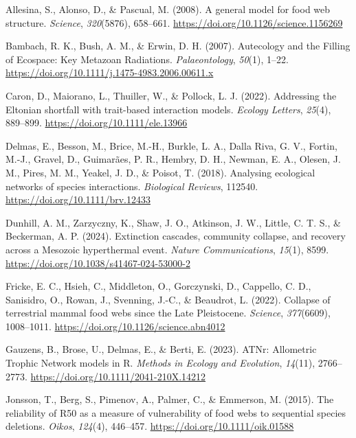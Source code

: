 \documentclass[
]{article}
\newlength{\cslhangindent}
\newenvironment{CSLReferences}[2] %
 {\begin{list}{}{%
  \setlength{\itemindent}{0pt}
  \setlength{\leftmargin}{0pt}
  \setlength{\parsep}{0pt}
  \ifodd #1
   \setlength{\leftmargin}{\cslhangindent}
   \setlength{\itemindent}{-1\cslhangindent}
  \fi
  \setlength{\itemsep}{#2\baselineskip}}}
 {\end{list}}
\begin{document}
\label{refs}
\begin{CSLReferences}{1}{0}
Allesina, S., Alonso, D., \& Pascual, M. (2008). A general model for
food web structure. \emph{Science}, \emph{320}(5876), 658--661.
\url{https://doi.org/10.1126/science.1156269}

Bambach, R. K., Bush, A. M., \& Erwin, D. H. (2007). Autecology and the
Filling of Ecospace: Key Metazoan Radiations. \emph{Palaeontology},
\emph{50}(1), 1--22.
\url{https://doi.org/10.1111/j.1475-4983.2006.00611.x}

Caron, D., Maiorano, L., Thuiller, W., \& Pollock, L. J. (2022).
Addressing the Eltonian shortfall with trait-based interaction models.
\emph{Ecology Letters}, \emph{25}(4), 889--899.
\url{https://doi.org/10.1111/ele.13966}

Delmas, E., Besson, M., Brice, M.-H., Burkle, L. A., Dalla Riva, G. V.,
Fortin, M.-J., Gravel, D., Guimarães, P. R., Hembry, D. H., Newman, E.
A., Olesen, J. M., Pires, M. M., Yeakel, J. D., \& Poisot, T. (2018).
Analysing ecological networks of species interactions. \emph{Biological
Reviews}, 112540. \url{https://doi.org/10.1111/brv.12433}

Dunhill, A. M., Zarzyczny, K., Shaw, J. O., Atkinson, J. W., Little, C.
T. S., \& Beckerman, A. P. (2024). Extinction cascades, community
collapse, and recovery across a Mesozoic hyperthermal event.
\emph{Nature Communications}, \emph{15}(1), 8599.
\url{https://doi.org/10.1038/s41467-024-53000-2}

Fricke, E. C., Hsieh, C., Middleton, O., Gorczynski, D., Cappello, C.
D., Sanisidro, O., Rowan, J., Svenning, J.-C., \& Beaudrot, L. (2022).
Collapse of terrestrial mammal food webs since the Late Pleistocene.
\emph{Science}, \emph{377}(6609), 1008--1011.
\url{https://doi.org/10.1126/science.abn4012}

Gauzens, B., Brose, U., Delmas, E., \& Berti, E. (2023). ATNr:
Allometric Trophic Network models in R. \emph{Methods in Ecology and
Evolution}, \emph{14}(11), 2766--2773.
\url{https://doi.org/10.1111/2041-210X.14212}

Jonsson, T., Berg, S., Pimenov, A., Palmer, C., \& Emmerson, M. (2015).
The reliability of R50 as a measure of vulnerability of food webs to
sequential species deletions. \emph{Oikos}, \emph{124}(4), 446--457.
\url{https://doi.org/10.1111/oik.01588}


\end{CSLReferences}
\end{document}
